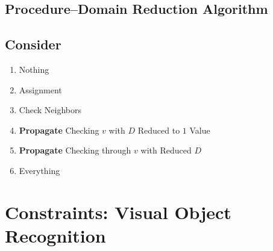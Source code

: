\documentclass[12pt]{book}
\begin{document}
\subsection{Procedure--Domain Reduction Algorithm}
\begin{algorithmic}
	\EndIf
	\EndIf
	\EndFor
	\EndFor
	\EndFor
	\EndFor
\end{algorithmic}
\subsection{Consider}
\begin{enumerate}
	\item Nothing
	\item Assignment
	\item Check Neighbors
	\item \textbf{Propagate} Checking $v$ with $D$ Reduced to $1$ Value  
	\item \textbf{Propagate} Checking through $v$ with Reduced $D$   
	\item Everything
\end{enumerate}
\newpage

\section{Constraints: Visual Object Recognition}
\end{document}
